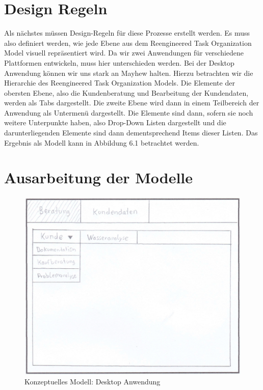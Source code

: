 \section{Design Regeln}

Als nächstes müssen Design-Regeln für diese Prozesse erstellt werden.  Es muss also definiert werden, wie jede Ebene aus dem Reengineered Task Organization Model visuell repräsentiert wird. Da wir zwei Anwendungen für verschiedene Plattformen entwickeln, muss hier unterschieden werden. Bei der Desktop Anwendung können wir uns stark an Mayhew halten. Hierzu betrachten wir die Hierarchie des Reengineered Task Organization Models. Die Elemente der obersten Ebene, also die Kundenberatung und Bearbeitung der Kundendaten, werden als Tabs dargestellt. Die zweite Ebene wird dann in einem Teilbereich der Anwendung als Untermenü dargestellt. Die Elemente sind dann, sofern sie noch weitere Unterpunkte haben, also Drop-Down Listen dargestellt und die darunterliegenden Elemente sind dann dementsprechend Items dieser Listen. Das Ergebnis als Modell kann in Abbildung 6.1 betrachtet werden.



\section{Ausarbeitung der Modelle}

\begin{figure}[htbp]
\centering
\includegraphics[width=\linewidth]{KModell1}
\caption{Konzeptuelles Modell: Desktop Anwendung}
\end{figure}

